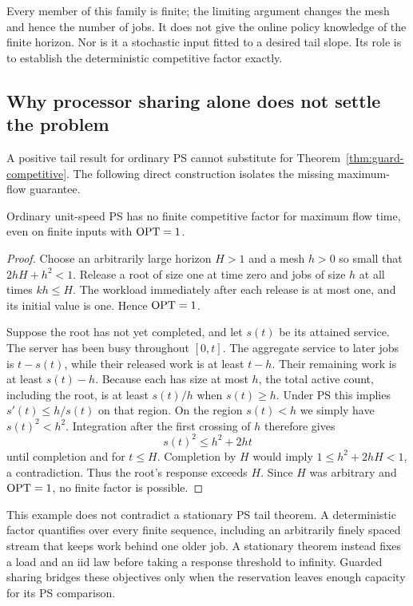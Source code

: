 Every member of this family is finite; the limiting argument changes the mesh and hence the number of jobs. It does not give the online policy knowledge of the finite horizon. Nor is it a stochastic input fitted to a desired tail slope. Its role is to establish the deterministic competitive factor exactly.

\subsection{Why processor sharing alone does not settle the problem}
A positive tail result for ordinary PS cannot substitute for Theorem~\ref{thm:guard-competitive}. The following direct construction isolates the missing maximum-flow guarantee.

\begin{proposition}\label{prop:ps-unbounded}
Ordinary unit-speed PS has no finite competitive factor for maximum flow time, even on finite inputs with $\operatorname{OPT}=1$.
\end{proposition}
\begin{proof}
Choose an arbitrarily large horizon $H>1$ and a mesh $h>0$ so small that $2hH+h^2<1$. Release a root of size one at time zero and jobs of size $h$ at all times $kh\leq H$. The workload immediately after each release is at most one, and its initial value is one. Hence $\operatorname{OPT}=1$.

Suppose the root has not yet completed, and let $s(t)$ be its attained service. The server has been busy throughout $[0,t]$. The aggregate service to later jobs is $t-s(t)$, while their released work is at least $t-h$. Their remaining work is at least $s(t)-h$. Because each has size at most $h$, the total active count, including the root, is at least $s(t)/h$ when $s(t)\geq h$. Under PS this implies $s'(t)\leq h/s(t)$ on that region. On the region $s(t)<h$ we simply have $s(t)^2<h^2$. Integration after the first crossing of $h$ therefore gives
\[
 s(t)^2\leq h^2+2ht
\]
until completion and for $t\leq H$. Completion by $H$ would imply $1\leq h^2+2hH<1$, a contradiction. Thus the root's response exceeds $H$. Since $H$ was arbitrary and $\operatorname{OPT}=1$, no finite factor is possible.
\end{proof}

This example does not contradict a stationary PS tail theorem. A deterministic factor quantifies over every finite sequence, including an arbitrarily finely spaced stream that keeps work behind one older job. A stationary theorem instead fixes a load and an iid law before taking a response threshold to infinity. Guarded sharing bridges these objectives only when the reservation leaves enough capacity for its PS comparison.

